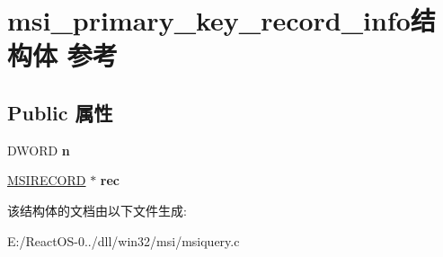 \hypertarget{structmsi__primary__key__record__info}{}\section{msi\+\_\+primary\+\_\+key\+\_\+record\+\_\+info结构体 参考}
\label{structmsi__primary__key__record__info}
\subsection*{Public 属性}
\begin{DoxyCompactItemize}
\item 
\mbox{\label{structmsi__primary__key__record__info_a2b6874c3f3f83e821eef32a56f5e8703}} 
D\+W\+O\+RD {\bfseries n}
\item 
\mbox{\label{structmsi__primary__key__record__info_adbf5aa2d8dcdce319162497d9cd94791}} 
\hyperlink{structtag_m_s_i_r_e_c_o_r_d}{M\+S\+I\+R\+E\+C\+O\+RD} $\ast$ {\bfseries rec}
\end{DoxyCompactItemize}


该结构体的文档由以下文件生成\+:\begin{DoxyCompactItemize}
\item 
E\+:/\+React\+O\+S-\/0../dll/win32/msi/msiquery.\+c\end{DoxyCompactItemize}
